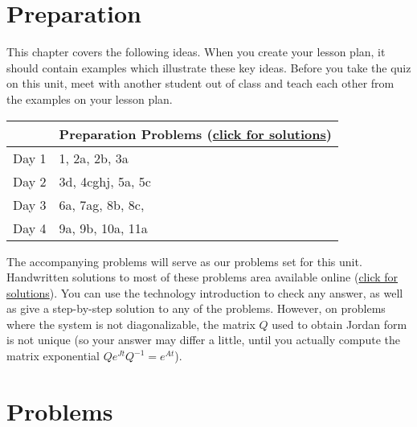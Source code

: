 \section{Preparation}

\noindent  
This chapter covers the following ideas. When you create your lesson plan, it should contain examples which illustrate these key ideas. Before you take the quiz on this unit, meet with another student out of class and teach each other from the examples on your lesson plan. 



\begin{center}
\begin{tabular}{ll}
&Preparation Problems 
(\href{https://ilearn.byui.edu/bbcswebdav/institution/Physical\_Sci\_Eng/Mathematics/Personal\%20Folders/WoodruffB/316/10-Systems-of-ODEs-Preparation-Solutions.pdf}{click for solutions})
\\
\hline\hline
Day 1& 1, 2a, 2b, 3a
\\\hline
Day 2& 3d, 4cghj, 5a, 5c
\\\hline
Day 3& 6a, 7ag, 8b, 8c,
\\\hline
Day 4& 9a, 9b, 10a, 11a
\\\hline
\end{tabular}
\end{center}



The accompanying problems will serve as our problems set for this unit.  Handwritten solutions to most of these problems area available online 
(\href{https://ilearn.byui.edu/bbcswebdav/institution/Physical\_Sci\_Eng/Mathematics/Personal\%20Folders/WoodruffB/316/10-Systems-of-ODEs-Preparation-Solutions.pdf}{click for solutions}).
You can use the technology introduction to check any answer, as well as give a step-by-step solution to any of the problems. However, on problems where the system is not diagonalizable, the matrix $Q$ used to obtain Jordan form is not unique (so your answer may differ a little, until you actually compute the matrix exponential $Qe^{Jt}Q^{-1}=e^{At}$).

\section{Problems}

